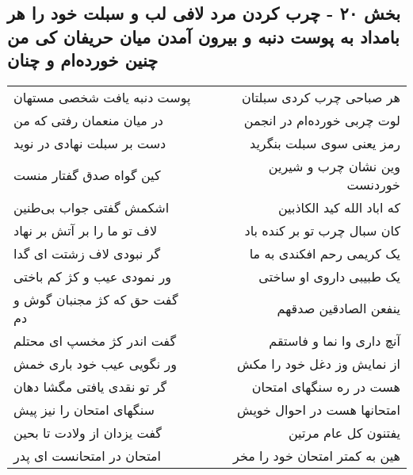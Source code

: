 \begin{center}
\section*{بخش ۲۰ - چرب کردن مرد لافی لب و سبلت خود را هر بامداد به پوست دنبه و بیرون آمدن میان  حریفان کی من چنین خورده‌ام و چنان}
\label{sec:sh020}
\begin{longtable}{l p{0.5cm} r}
پوست دنبه یافت شخصی مستهان
&&
هر صباحی چرب کردی سبلتان
\\
در میان منعمان رفتی که من
&&
لوت چربی خورده‌ام در انجمن
\\
دست بر سبلت نهادی در نوید
&&
رمز یعنی سوی سبلت بنگرید
\\
کین گواه صدق گفتار منست
&&
وین نشان چرب و شیرین خوردنست
\\
اشکمش گفتی جواب بی‌طنین
&&
که اباد الله کید الکاذبین
\\
لاف تو ما را بر آتش بر نهاد
&&
کان سبال چرب تو بر کنده باد
\\
گر نبودی لاف زشتت ای گدا
&&
یک کریمی رحم افکندی به ما
\\
ور نمودی عیب و کژ کم باختی
&&
یک طبیبی داروی او ساختی
\\
گفت حق که کژ مجنبان گوش و دم
&&
ینفعن الصادقین صدقهم
\\
گفت اندر کژ مخسپ ای محتلم
&&
آنچ داری وا نما و فاستقم
\\
ور نگویی عیب خود باری خمش
&&
از نمایش وز دغل خود را مکش
\\
گر تو نقدی یافتی مگشا دهان
&&
هست در ره سنگهای امتحان
\\
سنگهای امتحان را نیز پیش
&&
امتحانها هست در احوال خویش
\\
گفت یزدان از ولادت تا بحین
&&
یفتنون کل عام مرتین
\\
امتحان در امتحانست ای پدر
&&
هین به کمتر امتحان خود را مخر
\\
\end{longtable}
\end{center}
